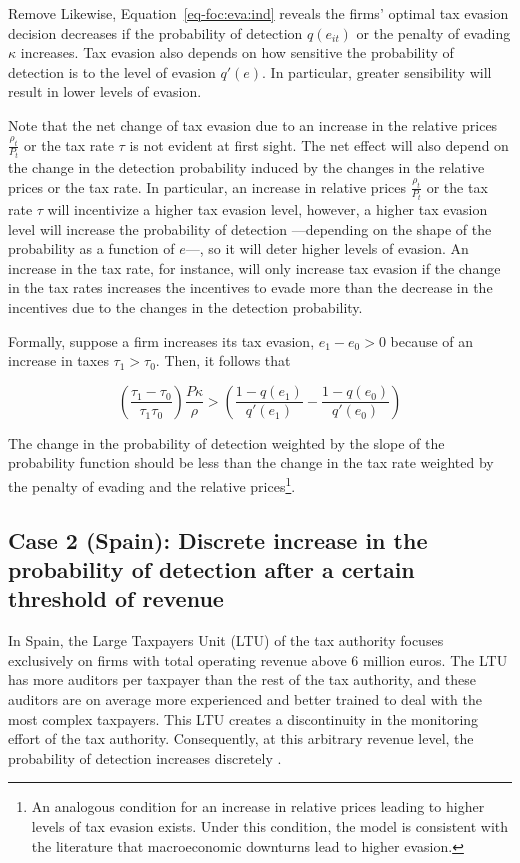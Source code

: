 \documentclass[
  12pt]{article}
\theoremstyle{definition}
\theoremstyle{remark}
\begin{document}
\begin{anfxnote}{Remove}
Likewise, Equation~\ref{eq-foc:eva:ind} reveals the firms' optimal tax
evasion decision decreases if the probability of detection \(q(e_{it})\)
or the penalty of evading \(\kappa\) increases. Tax evasion also depends
on how sensitive the probability of detection is to the level of evasion
\(q'(e)\). In particular, greater sensibility will result in lower
levels of evasion.

Note that the net change of tax evasion due to an increase in the
relative prices \(\frac{\rho_{t}}{P_t}\) or the tax rate \(\tau\) is not
evident at first sight. The net effect will also depend on the change in
the detection probability induced by the changes in the relative prices
or the tax rate. In particular, an increase in relative prices
\(\frac{\rho_{t}}{P_t}\) or the tax rate \(\tau\) will incentivize a
higher tax evasion level, however, a higher tax evasion level will
increase the probability of detection ---depending on the shape of the
probability as a function of \(e\)---, so it will deter higher levels of
evasion. An increase in the tax rate, for instance, will only increase
tax evasion if the change in the tax rates increases the incentives to
evade more than the decrease in the incentives due to the changes in the
detection probability.

Formally, suppose a firm increases its tax evasion, \(e_1-e_0>0\)
because of an increase in taxes \(\tau_1>\tau_0\). Then, it follows that

\[
\left(\frac{\tau_1-\tau_0}{\tau_1\tau_0}\right)\frac{P\kappa}{\rho}>
  \left(\frac{1-q(e_1)}{q'(e_1)}-\frac{1-q(e_0)}{q'(e_0)}\right)
\]

The change in the probability of detection weighted by the slope of the
probability function should be less than the change in the tax rate
weighted by the penalty of evading and the relative prices\footnote{An
  analogous condition for an increase in relative prices leading to
  higher levels of tax evasion exists. Under this condition, the model
  is consistent with the literature that macroeconomic downturns lead to
  higher evasion.}.

\subsection{Case 2 (Spain): Discrete increase in the probability of
detection after a certain threshold of
revenue}\label{case-2-spain-discrete-increase-in-the-probability-of-detection-after-a-certain-threshold-of-revenue}

In Spain, the Large Taxpayers Unit (LTU) of the tax authority focuses
exclusively on firms with total operating revenue above 6 million euros.
The LTU has more auditors per taxpayer than the rest of the tax
authority, and these auditors are on average more experienced and better
trained to deal with the most complex taxpayers. This LTU creates a
discontinuity in the monitoring effort of the tax authority.
Consequently, at this arbitrary revenue level, the probability of
detection increases discretely \citep{Almunia2018}.


\end{anfxnote}
\end{document}

